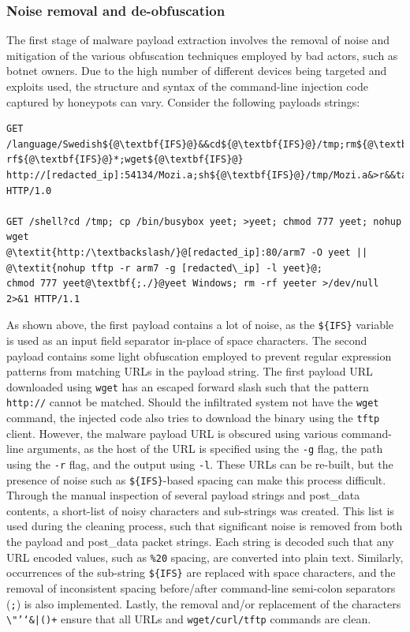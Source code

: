 \subsubsection{Noise removal and de-obfuscation}

The first stage of malware payload extraction involves the removal of noise and mitigation of the various obfuscation techniques employed by bad actors, such as botnet owners. Due to the high number of different devices being targeted and exploits used, the structure and syntax of the command-line injection code captured by honeypots can vary. Consider the following payloads strings:

\begin{lstlisting}[escapechar=@, caption={Example of noisy and obfuscated botnet payloads. Examples of noise are highlighted in \textbf{bold}, and obfuscation in \textit{italics}.}]
GET /language/Swedish${@\textbf{IFS}@}&&cd${@\textbf{IFS}@}/tmp;rm${@\textbf{IFS}@}-rf${@\textbf{IFS}@}*;wget${@\textbf{IFS}@}
http://[redacted_ip]:54134/Mozi.a;sh${@\textbf{IFS}@}/tmp/Mozi.a&>r&&tar${@\textbf{IFS}@}/string.js HTTP/1.0

GET /shell?cd /tmp; cp /bin/busybox yeet; >yeet; chmod 777 yeet; nohup wget
@\textit{http:/\textbackslash/}@[redacted_ip]:80/arm7 -O yeet || @\textit{nohup tftp -r arm7 -g [redacted\_ip] -l yeet}@;
chmod 777 yeet@\textbf{;./}@yeet Windows; rm -rf yeeter >/dev/null 2>&1 HTTP/1.1
\end{lstlisting}

As shown above, the first payload contains a lot of noise, as the \texttt{\$\{IFS\}} variable is used as an input field separator in-place of space characters. The second payload contains some light obfuscation employed to prevent regular expression patterns from matching URLs in the payload string. The first payload URL downloaded using \texttt{wget} has an escaped forward slash such that the pattern \texttt{http://} cannot be matched. Should the infiltrated system not have the \texttt{wget} command, the injected code also tries to download the binary using the \texttt{tftp} client. However, the malware payload URL is obscured using various command-line arguments, as the host of the URL is specified using the \texttt{-g} flag, the path using the \texttt{-r} flag, and the output using \texttt{-l}. These URLs can be re-built, but the presence of noise such as \texttt{\$\{IFS\}}-based spacing can make this process difficult. Through the manual inspection of several payload strings and post\_data contents, a short-list of noisy characters and sub-strings was created. This list is used during the cleaning process, such that significant noise is removed from both the payload and post\_data packet strings. Each string is decoded such that any URL encoded values, such as \texttt{\%20} spacing, are converted into plain text. Similarly, occurrences of the sub-string \texttt{\$\{IFS\}} are replaced with space characters, and the removal of inconsistent spacing before/after command-line semi-colon separators (\texttt{;}) is also implemented. Lastly, the removal and/or replacement of the characters \texttt{\textbackslash"'`\&|()+} ensure that all URLs and \texttt{wget/curl/tftp} commands are clean.

